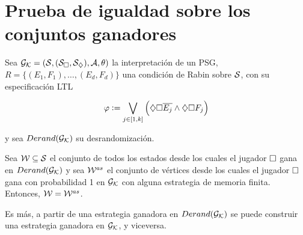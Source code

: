 \section{Prueba de igualdad sobre los conjuntos ganadores}

\begin{theorem}
	\label{teocuali}
	Sea $\mathcal{G}_{\mathcal{K}} = (\mathcal{S}, (\mathcal{S}_\square, \mathcal{S}_\diamondsuit), \mathcal{A}, \theta)$ la interpretación de un PSG, \\ $R = \{(E_1, F_1), \dots, (E_d, F_d)\}$ una condición de Rabin sobre $\mathcal{S}$, con su especificación LTL

	$$
		\varphi := \bigvee_{j \in [1, k]} \left( \diamondsuit \square \overline{E_j} \wedge \diamondsuit \square F_j \right)
	$$

	y sea $Derand(\mathcal{G}_{\mathcal{K}})$ su desrandomización.

	Sea $\mathcal{W} \subseteq \mathcal{S}$ el conjunto de todos los estados desde los cuales el
	jugador $\square$ gana en $Derand(\mathcal{G}_{\mathcal{K}})$ y sea $\mathcal{W}^{as}$ el conjunto de vértices desde
	los cuales el jugador $\square$ gana con probabilidad 1 en $\mathcal{G}_{\mathcal{K}}$ con alguna
	estrategia de memoria finita. Entonces, $\mathcal{W} = \mathcal{W}^{as}$.

	Es más, a partir de una estrategia ganadora en $Derand(\mathcal{G}_{\mathcal{K}})$ se puede construir una
	estrategia ganadora en $\mathcal{G}_{\mathcal{K}}$, y viceversa.
\end{theorem}

